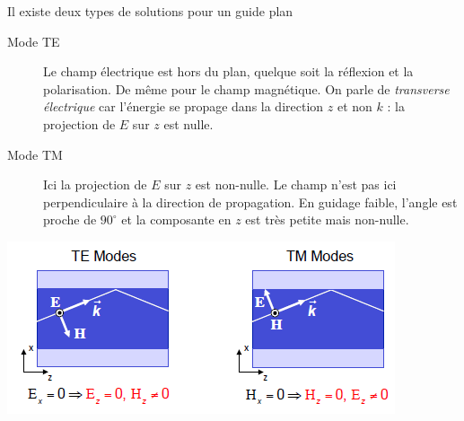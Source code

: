 Il existe deux types de solutions pour un guide plan
\begin{description}
\item[Mode TE] Le champ électrique est hors du plan, quelque soit la réflexion et la polarisation. 
De même pour le champ magnétique. On parle de \textit{transverse électrique} car l'énergie se propage
dans la direction $z$ et non $k$ : la projection de $E$ sur $z$ est nulle.
\item[Mode TM] Ici la projection de $E$ sur $z$ est non-nulle. Le champ n'est pas ici perpendiculaire à la direction de propagation. En guidage faible, l'angle est proche de $90^\circ$ et la composante
en $z$ est très petite mais non-nulle.
\end{description}

\begin{center}
	\includegraphics[scale=0.75]{ch1/image12}
\end{center}


